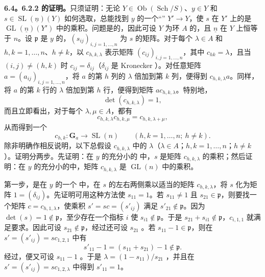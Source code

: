 \textbf{6.4。6.2.2 的证明。}只须证明：无论 $Y\in\operatorname{Ob}(\operatorname{Sch}/S)$、$y\in Y$ 和 $s\in\operatorname{SL}(\underline n)(Y)$ 如何选取，总能找到 $y$ 的一个“” $Y'\to Y$，使 $s$ 在 $Y'$ 上的是 $\operatorname{GL}(\underline n)(Y')$ 中的乘积。问题是的，因此可设 $Y$ 为环 $A$ 的，且 $\underline n$ 在 $Y$ 上恒等于 $n$。设 $\mathfrak p$ 是 $y$ 的，$(s_{ij})_{i,j=1,\ldots,n}$ 为 $s$ 的矩阵。对于每个 $\lambda\in A$ 和 $h,k=1,\ldots,n$、$h\ne k$，以 $c_{h,k,\lambda}$ 表示矩阵 $(c_{ij})_{i,j=1,\ldots,n}$，其中 $c_{hk}=\lambda$，且当 $(i,j)\ne(h,k)$ 时 $c_{ij}=\delta_{ij}$（$\delta_{ij}$ 是 Kronecker ）。对任意矩阵 $a=(a_{ij})_{i,j=1,\ldots,n}$，将 $a$ 的第 $h$ 列的 $\lambda$ 倍加到第 $k$ 列，便得到 $c_{h,k,\lambda}a$。同样，将 $a$ 的第 $k$ 行的 $\lambda$ 倍加到第 $h$ 行，便得到矩阵 $ac_{h,k,\lambda}$。特别地，
\[
 \det(c_{h,k,\lambda})=1,
\]
而且立即看出，对于每个 $\lambda,\mu\in A$，都有
\[
 c_{h,k,\lambda}c_{h,k,\mu}=c_{h,k,\lambda+\mu},\tag{6.3.1}
\]
从而得到一个
\[
 c_{h,k}:\mathbf G_a\longrightarrow\operatorname{SL}(n)
 \qquad(h,k=1,\ldots,n;\ h\ne k).
\]
除非明确作相反说明，以下总假设 $c_{h,k,\lambda}$ 中的 $\lambda$（$\lambda\in A$；$h,k=1,\ldots,n$；$h\ne k$）。证明分两步。先证明：在 $y$ 的充分小的 中，$s$ 是矩阵 $c_{h,k,\lambda}$ 的乘积；然后证明：在 $y$ 的充分小的中，矩阵 $c_{h,k,\lambda}$ 是 $\operatorname{GL}(n)$ 中的乘积。

第一步，是在 $y$ 的一个 中，在 $s$ 的左右两侧乘以适当的矩阵 $c_{h,k,\lambda}$，将 $s$ 化为矩阵 $1=(\delta_{ij})$。先证明可用这种方法使 $s_{11}=1$。若 $s_{11}\ne1$ 且 $s_{21}\in\mathfrak p$，则要找一个矩阵 $c=c_{h,1,\lambda}$，使乘积 $s'=sc=(s'_{ij})$ 满足 $s'_{21}\notin\mathfrak p$。因为 $\det(s)=1\notin\mathfrak p$，至少存在一个指标 $i$ 使 $s_{i1}\notin\mathfrak p$。于是 $s_{21}+s_{i1}\notin\mathfrak p$，$c_{i,1,1}$ 就满足要求。因此可设 $s_{21}\notin\mathfrak p$，经过还可设 $s_{21}$ 。若 $s_{11}-1\in\mathfrak p$，则在 $s'=(s'_{ij})=sc_{1,2,1}$ 中有
\[
 s'_{11}-1=(s_{11}+s_{21})-1\notin\mathfrak p.
\]
经过，便又可设 $s_{11}-1$ 。于是 $\lambda=(1-s_{11})/s_{21}$ ，并且在 $s'=(s'_{ij})=sc_{1,2,\lambda}$ 中得到 $s'_{11}=1$。

